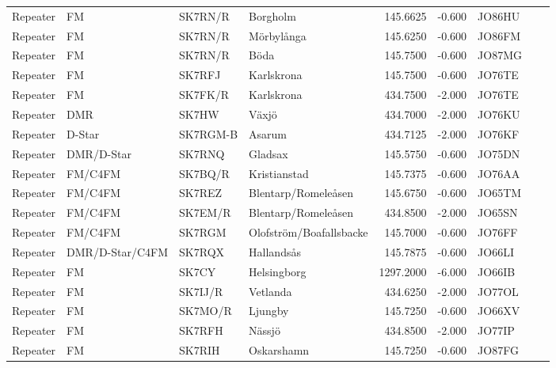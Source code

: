 \begin{longtable}{llllrrlcl}
	Repeater & FM              & SK7RN/R  & Borgholm                &   145.6625 &   -0.600 & JO86HU &  &  \\
	Repeater & FM              & SK7RN/R  & Mörbylånga              &   145.6250 &   -0.600 & JO86FM &  &  \\
	Repeater & FM              & SK7RN/R  & Böda                    &   145.7500 &   -0.600 & JO87MG &  &  \\
	Repeater & FM              & SK7RFJ   & Karlskrona              &   145.7500 &   -0.600 & JO76TE &  &  \\
	Repeater & FM              & SK7FK/R  & Karlskrona              &   434.7500 &   -2.000 & JO76TE &  &  \\
	Repeater & DMR             & SK7HW    & Växjö                   &   434.7000 &   -2.000 & JO76KU &  &  \\
	Repeater & D-Star          & SK7RGM-B & Asarum                  &   434.7125 &   -2.000 & JO76KF &  &  \\
	Repeater & DMR/D-Star      & SK7RNQ   & Gladsax                 &   145.5750 &   -0.600 & JO75DN &  &  \\
	Repeater & FM/C4FM         & SK7BQ/R  & Kristianstad            &   145.7375 &   -0.600 & JO76AA &  &  \\
	Repeater & FM/C4FM         & SK7REZ   & Blentarp/Romeleåsen     &   145.6750 &   -0.600 & JO65TM &  &  \\
	Repeater & FM/C4FM         & SK7EM/R  & Blentarp/Romeleåsen     &   434.8500 &   -2.000 & JO65SN &  &  \\
	Repeater & FM/C4FM         & SK7RGM   & Olofström/Boafallsbacke &   145.7000 &   -0.600 & JO76FF &  &  \\
	Repeater & DMR/D-Star/C4FM & SK7RQX   & Hallandsås              &   145.7875 &   -0.600 & JO66LI &  &  \\
	Repeater & FM              & SK7CY    & Helsingborg             &  1297.2000 &   -6.000 & JO66IB &  &  \\
	Repeater & FM              & SK7IJ/R  & Vetlanda                &   434.6250 &   -2.000 & JO77OL &  &  \\
	Repeater & FM              & SK7MO/R  & Ljungby                 &   145.7250 &   -0.600 & JO66XV &  &  \\
	Repeater & FM              & SK7RFH   & Nässjö                  &   434.8500 &   -2.000 & JO77IP &  &  \\
	Repeater & FM              & SK7RIH   & Oskarshamn              &   145.7250 &   -0.600 & JO87FG &  &  \\

\end{longtable}
